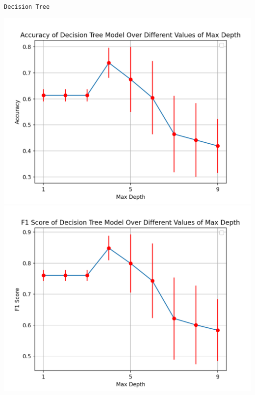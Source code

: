 \documentclass{article}
\begin{document}
\begin{center}
    \texttt{Decision Tree}
\end{center}

\begin{minipage}{0.49\textwidth}
    \centering 

    \includegraphics*[width=\textwidth]{./src/figures/Accuracy Titanic.png}
    \includegraphics*[width=\textwidth]{./src/figures/F-Score Titanic.png}

\end{minipage}
\end{document}
